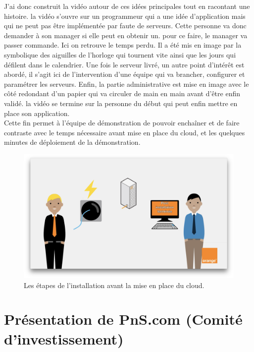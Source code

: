 J'ai donc construit la vidéo autour de ces idées principales tout en racontant une histoire. la vidéo s'ouvre sur un programmeur qui a une idée d'application mais qui ne peut pas être implémentée par faute de serveurs. Cette personne va donc demander à son manager si elle peut en obtenir un. pour ce faire, le manager va passer commande. Ici on retrouve le temps perdu. Il a été mis en image par la symbolique des aiguilles de l'horloge qui tournent vite ainsi que les jours qui défilent dans le calendrier. Une fois le serveur livré, un autre point d'intérêt est abordé, il s'agit ici de l'intervention d'une équipe qui va brancher, configurer et paramétrer les serveurs. Enfin, la partie administrative est mise en image avec le côté redondant d'un papier qui va circuler de main en main avant d'être enfin validé. la vidéo se termine sur la personne du début qui peut enfin mettre en place son application.\\

Cette fin permet à l'équipe de démonstration de pouvoir enchaîner et de faire contraste avec le temps nécessaire avant mise en place du cloud, et les quelques minutes de déploiement de la démonstration.

\begin{figure}[htp]
  \centering
  \includegraphics[width=15cm]{images/cd/cd.png}
  \caption{Les étapes de l'installation avant la mise en place du cloud.}
  \label{comite}
\end{figure}



\section{Présentation de PnS.com (Comité d'investissement)}
